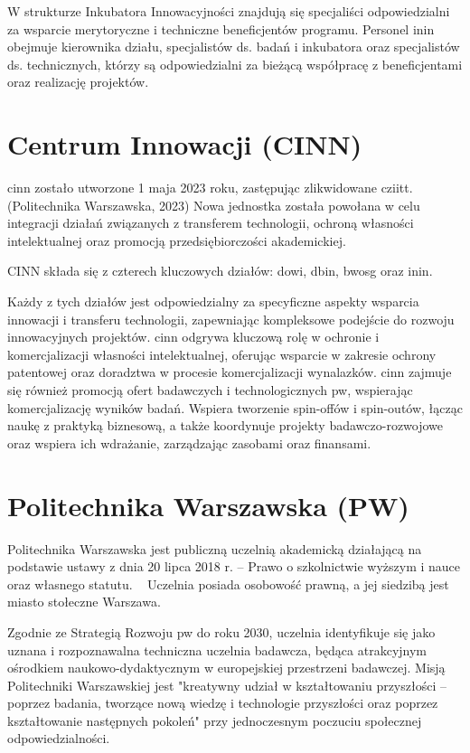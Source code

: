 W strukturze Inkubatora Innowacyjności znajdują się specjaliści odpowiedzialni za wsparcie merytoryczne i techniczne beneficjentów programu. Personel \gls{inin} obejmuje kierownika działu, specjalistów ds. badań i inkubatora oraz specjalistów ds. technicznych, którzy są odpowiedzialni za bieżącą współpracę z beneficjentami oraz realizację projektów.

\section{Centrum Innowacji (CINN)}
\gls{cinn} zostało utworzone 1 maja 2023 roku, zastępując zlikwidowane \gls{cziitt}. (Politechnika Warszawska, 2023) Nowa jednostka została powołana w celu integracji działań związanych z transferem technologii, ochroną własności intelektualnej oraz promocją przedsiębiorczości akademickiej.

CINN składa się z czterech kluczowych działów: \gls{dowi}, \gls{dbin}, \gls{bwosg} oraz \gls{inin}.

Każdy z tych działów jest odpowiedzialny za specyficzne aspekty wsparcia innowacji i transferu technologii, zapewniając kompleksowe podejście do rozwoju innowacyjnych projektów. \gls{cinn} odgrywa kluczową rolę w ochronie i komercjalizacji własności intelektualnej, oferując wsparcie w zakresie ochrony patentowej oraz doradztwa w procesie komercjalizacji wynalazków. \gls{cinn} zajmuje się również promocją ofert badawczych i technologicznych \gls{pw}, wspierając komercjalizację wyników badań.
Wspiera tworzenie spin-offów i spin-outów, łącząc naukę z praktyką biznesową, a także koordynuje projekty badawczo-rozwojowe oraz wspiera ich wdrażanie, zarządzając zasobami oraz finansami.

\section{Politechnika Warszawska (PW)}

Politechnika Warszawska jest publiczną uczelnią akademicką działającą na podstawie ustawy z dnia 20 lipca 2018 r. – Prawo o szkolnictwie wyższym i nauce oraz własnego statutu. ~\parencite[s. 7]{statutPW} Uczelnia posiada osobowość prawną, a jej siedzibą jest miasto stołeczne Warszawa. 

Zgodnie ze Strategią Rozwoju \gls{pw} do roku 2030, uczelnia identyfikuje się jako uznana i rozpoznawalna techniczna uczelnia badawcza, będąca atrakcyjnym ośrodkiem naukowo-dydaktycznym w europejskiej przestrzeni badawczej.  Misją Politechniki Warszawskiej jest "kreatywny udział w kształtowaniu przyszłości – poprzez badania, tworzące nową wiedzę i technologie przyszłości oraz poprzez kształtowanie następnych pokoleń" przy jednoczesnym poczuciu społecznej odpowiedzialności. ~\parencite[s. 11]{PW2030} 

